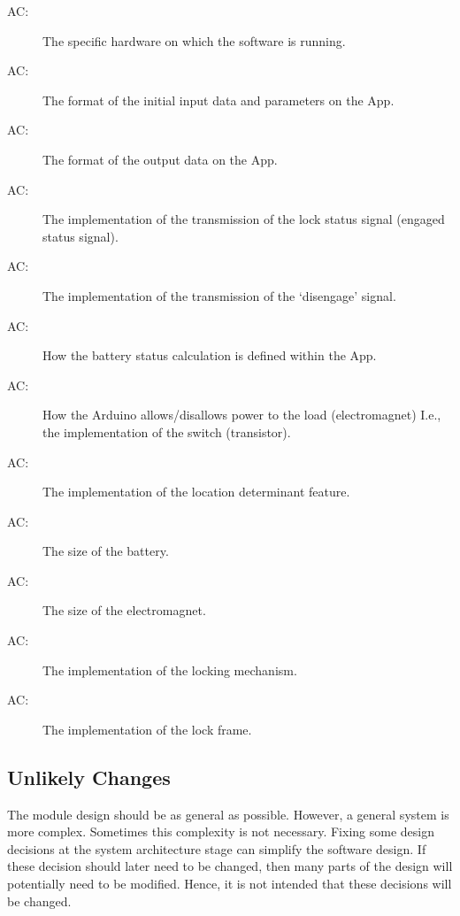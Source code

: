 \documentclass[12pt, titlepage]{article}
\newcounter{acnum}
\newcommand{\actheacnum}{AC\theacnum}
\begin{document}
\begin{description}
\item[ \actheacnum \label{acHardware}:]  The specific hardware on which the software is running. 
\item[\actheacnum\label{acInput}:] The format of the initial input data and parameters on the App. 
\item[\actheacnum\label{acOutput}:] The format of the output data on the App. 
\item[\actheacnum\label{acEngage}:] The implementation of the transmission of the lock status signal (engaged status signal). 
\item[\actheacnum\label{acDisengage}:] The implementation of the transmission of the ‘disengage’ signal. 
\item[\actheacnum\label{acBatteryStatus}:] How the battery status calculation is defined within the App. 
\item[\actheacnum\label{acPowerSignal}:] How the Arduino allows/disallows power to the load (electromagnet) I.e., the implementation of the switch (transistor). 
\item[\actheacnum\label{acGeocaching}:] The implementation of the location determinant feature. 
\item[\actheacnum\label{acBattery}:] The size of the battery. 
\item[\actheacnum\label{acMagnet}:] The size of the electromagnet. 
\item[\actheacnum\label{acLockingMechanism}:] The implementation of the locking mechanism. 
\item[\actheacnum\label{acLockFrame}:] The implementation of the lock frame. 

\end{description}

\subsection{Unlikely Changes} \label{SecUchange}

The module design should be as general as possible. However, a general system is
more complex. Sometimes this complexity is not necessary. Fixing some design
decisions at the system architecture stage can simplify the software design. If
these decision should later need to be changed, then many parts of the design
will potentially need to be modified. Hence, it is not intended that these
decisions will be changed.
\end{document}
